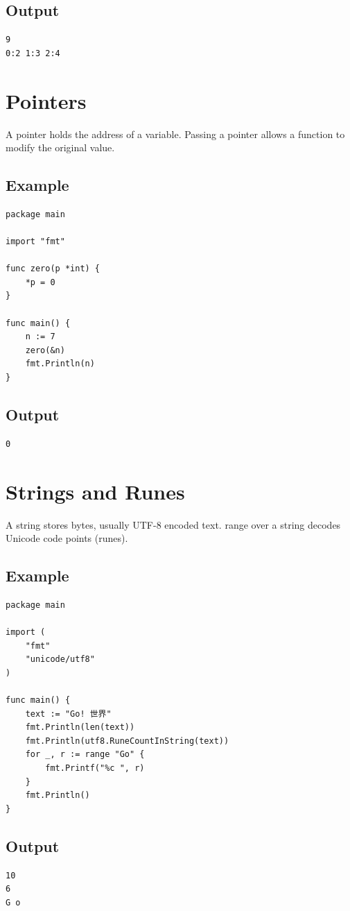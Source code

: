 \documentclass[10pt,oneside]{article}
\newcommand{\sectionline}{\par\vspace{4pt}{\color{rule}\hrule height .5pt}\vspace{7pt}\color{ink}\noindent}
\begin{document}
\subsection*{Output}
\begin{lstlisting}[style=terminal]
9
0:2 1:3 2:4 
\end{lstlisting}
\clearpage
\section{Pointers}
\sectionline
A pointer holds the address of a variable. Passing a pointer allows a function to modify the original value.\par
\subsection*{Example}
\begin{lstlisting}[style=gocode]
package main

import "fmt"

func zero(p *int) {
	*p = 0
}

func main() {
	n := 7
	zero(&n)
	fmt.Println(n)
}
\end{lstlisting}
\subsection*{Output}
\begin{lstlisting}[style=terminal]
0
\end{lstlisting}
\clearpage
\section{Strings and Runes}
\sectionline
A string stores bytes, usually UTF-8 encoded text. range over a string decodes Unicode code points (runes).\par
\subsection*{Example}
\begin{lstlisting}[style=gocode]
package main

import (
	"fmt"
	"unicode/utf8"
)

func main() {
	text := "Go! 世界"
	fmt.Println(len(text))
	fmt.Println(utf8.RuneCountInString(text))
	for _, r := range "Go" {
		fmt.Printf("%c ", r)
	}
	fmt.Println()
}
\end{lstlisting}
\subsection*{Output}
\begin{lstlisting}[style=terminal]
10
6
G o 
\end{lstlisting}
\clearpage
\end{document}
